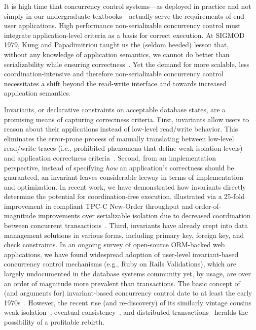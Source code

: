 It is high time that concurrency control systems---as deployed in practice and not simply in our undergraduate textbooks---actually serve the requirements of end-user applications. High performance non-serializable concurrency control must integrate application-level criteria as a basis for correct execution. At SIGMOD 1979, Kung and Papadimitriou taught us the (seldom heeded) lesson that, without any knowledge of application semantics, we cannot do better than serializability while ensuring correctness~\cite{kung1979optimality}. Yet the demand for more scalable, less coordination-intensive and therefore non-serializable concurrency control necessitates a shift beyond the read-write interface and towards increased application semantics.

Invariants, or declarative constraints on acceptable database states, are a promising means of capturing correctness criteria. First, invariants allow users to reason about their applications instead of low-level read/write behavior. This eliminates the error-prone process of manually translating between low-level read/write traces (i.e., prohibited phenomena that define weak isolation levels) and application correctness criteria~\cite{consistency-borders}. Second, from an implementation perspective, instead of specifying \textit{how} an application's correctness should be guaranteed, an invariant leaves considerable leeway in terms of implementation and optimization. In recent work, we have demonstrated how invariants directly determine the potential for coordination-free execution, illustrated via a 25-fold improvement in compliant TPC-C New-Order throughput and order-of-magnitude improvements over serializable isolation due to decreased coordination between concurrent transactions~\cite{coord-avoid}. Third, invariants have already crept into data management solutions in various forms, including primary key, foreign key, and check constraints. In an ongoing survey of open-source ORM-backed web applications, we have found widespread adoption of user-level invariant-based concurrency control mechanisms (e.g., Ruby on Rails Validations), which are largely undocumented in the database systems community yet, by usage, are over an order of magnitude more prevalent than transactions. The basic concept of (and arguments for) invariant-based concurrency control date to at least the early 1970s~\cite{florentin-constraints}. However, the recent rise (and re-discovery) of its similarly vintage cousins weak isolation~\cite{gray-isolation}, eventual consistency~\cite{ec-rfc}, and distributed transactions~\cite{chu-avoiding} heralds the possibility of a profitable rebirth.

